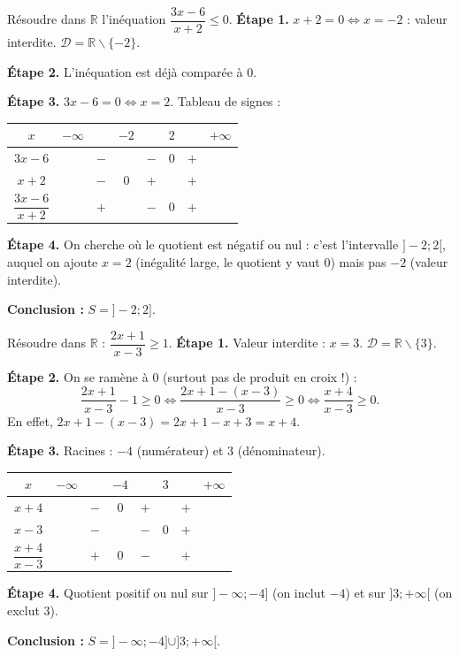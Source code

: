 \documentclass[11pt]{article}
\def\setminus{\mathbin{\backslash}}\let\smallsetminus\setminus
\begin{document}
\begin{exoresolu}
Résoudre dans $\mathbb{R}$ l'inéquation $\dfrac{3x-6}{x+2} \leq 0$.
\tcblower
\textbf{Étape 1.} $x+2 = 0 \iff x = -2$ : valeur interdite. $\mathcal{D} = \mathbb{R} \setminus \{-2\}$.

\textbf{Étape 2.} L'inéquation est déjà comparée à $0$.

\textbf{Étape 3.} $3x-6 = 0 \iff x = 2$. Tableau de signes :
\begin{center}
\begin{tabular}{|c|cc||ccccc|}
\hline
$x$ & $-\infty$ & & $-2$ & & $2$ & & $+\infty$ \\
\hline
$3x-6$ & & $-$ & & $-$ & $0$ & $+$ & \\
\hline
$x+2$ & & $-$ & $0$ & $+$ & & $+$ & \\
\hline
$\dfrac{3x-6}{x+2}$ & & $+$ & & $-$ & $0$ & $+$ & \\
\hline
\end{tabular}
\end{center}

\textbf{Étape 4.} On cherche où le quotient est négatif ou nul : c'est l'intervalle $]-2 ; 2[$, auquel on ajoute $x = 2$ (inégalité large, le quotient y vaut $0$) mais pas $-2$ (valeur interdite).

\textbf{Conclusion :} $S = ]-2 ; 2]$.
\end{exoresolu}

\begin{exoresolu}
Résoudre dans $\mathbb{R}$ : $\dfrac{2x+1}{x-3} \geq 1$.
\tcblower
\textbf{Étape 1.} Valeur interdite : $x = 3$. $\mathcal{D} = \mathbb{R} \setminus \{3\}$.

\textbf{Étape 2.} On se ramène à $0$ (surtout pas de produit en croix !) :
\[ \frac{2x+1}{x-3} - 1 \geq 0 \iff \frac{2x+1 - (x-3)}{x-3} \geq 0 \iff \frac{x+4}{x-3} \geq 0. \]
En effet, $2x+1-(x-3) = 2x+1-x+3 = x+4$.

\textbf{Étape 3.} Racines : $-4$ (numérateur) et $3$ (dénominateur).
\begin{center}
\begin{tabular}{|c|ccccc||cc|}
\hline
$x$ & $-\infty$ & & $-4$ & & $3$ & & $+\infty$ \\
\hline
$x+4$ & & $-$ & $0$ & $+$ & & $+$ & \\
\hline
$x-3$ & & $-$ & & $-$ & $0$ & $+$ & \\
\hline
$\dfrac{x+4}{x-3}$ & & $+$ & $0$ & $-$ & & $+$ & \\
\hline
\end{tabular}
\end{center}

\textbf{Étape 4.} Quotient positif ou nul sur $]-\infty ; -4]$ (on inclut $-4$) et sur $]3 ; +\infty[$ (on exclut $3$).

\textbf{Conclusion :} $S = ]-\infty ; -4] \cup ]3 ; +\infty[$.
\end{exoresolu}
\end{document}

